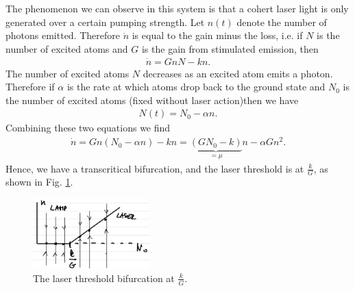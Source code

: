 \begin{enumerate}
\begin{ex}
		The phenomenon we can observe in this system is that a cohert laser light is only generated over a certain pumping strength. Let $n(t)$ denote the number of photons emitted. Therefore $\dot{n}$ is equal to the gain minus the loss, i.e. if $N$ is the number of excited atoms and $G$ is the gain from stimulated emission, then 
		\begin{align}
			\dot{n} = GnN - kn.
		\end{align}
		The number of excited atoms $N$ decreases as an excited atom emits a photon. Therefore if $\alpha $ is the rate at which atoms drop back to the ground state and $N_0$ is the number of excited atoms (fixed without laser action)then we have 
		\begin{align}
			N(t) = N_0 - \alpha n.
		\end{align}
		Combining these two equations we find
		\begin{align}
			\dot{n} = Gn(N_0 - \alpha n) - kn = \underbrace{(GN_0 - k)}_{= \mu } n - \alpha Gn^2.
		\end{align}
		Hence, we have a transcritical bifurcation, and the laser threshold is at $\frac{k}{G}$, as shown in Fig. \ref{fig:laser_threshold_bif}.
		\begin{figure}[h!]
			\centering
			\includegraphics[width=0.4\textwidth]{figures/ch3/15laser_threshold_bif.png}
			\caption{The laser threshold bifurcation at $\frac{k}{G}$.}
			\label{fig:laser_threshold_bif}
		\end{figure}
	\end{ex}
	

\end{enumerate}
